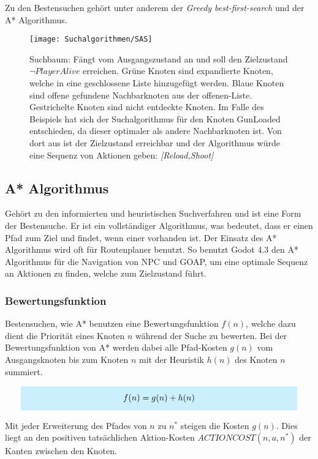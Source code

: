 Zu den Bestensuchen gehört unter anderem der \textit{Greedy best-first-search} und der A* Algorithmus.


\begin{figure}[h]
  \centering
  \texttt{[image: Suchalgorithmen/SAS]}
	\captionsetup{justification=justified, format=plain}
  \caption{Suchbaum: Fängt vom Ausgangszustand an und soll den Zielzustand $\lnot \textit{PlayerAlive}$ erreichen. Grüne Knoten sind expandierte Knoten, welche in eine geschlossene Liste hinzugefügt werden. Blaue Knoten sind offene gefundene Nachbarknoten aus der offenen-Liste. Gestrichelte Knoten sind nicht entdeckte Knoten. Im Falle des Beispiels hat sich der Suchalgorithmus für den Knoten GunLoaded entschieden, da dieser optimaler als andere Nachbarknoten ist. Von dort aus ist der Zielzustand erreichbar und der Algorithmus würde eine Sequenz von Aktionen geben: \textit{[Reload,Shoot]}}
  \label{Suchalgorithmen}
\end{figure}
\clearpage

\subsection{A* Algorithmus}

Gehört zu den informierten und heuristischen Suchverfahren und ist eine Form der Bestensuche. Er ist ein vollständiger Algorithmus, was bedeutet, dass er einen Pfad zum Ziel und findet, wenn einer vorhanden ist. Der Einsatz des A* Algorithmus wird oft für Routenplaner benutzt. So benutzt Godot 4.3 den A* Algorithmus für die Navigation von NPC und GOAP, um eine optimale Sequenz an Aktionen zu finden, welche zum Zielzustand führt.

\subsubsection{Bewertungsfunktion}

Bestensuchen, wie A* benutzen eine Bewertungsfunktion $f(n)$, welche dazu dient die Priorität eines Knoten $n$ während der Suche zu bewerten. Bei der Bewertungsfunktion von A* werden dabei alle Pfad-Kosten $g(n)$ vom Ausgangsknoten bis zum Knoten $n$ mit der Heuristik $h(n)$ des Knoten $n$ summiert.

\[
\highlightbox{0.9\textwidth}{$
    \begin{aligned}
			f(n) = g(n) + h(n)
    \end{aligned}
$}
\]

Mit jeder Erweiterung des Pfades von $n$ zu $n^{\ast}$ steigen die Kosten $g(n)$. Dies liegt an den positiven tatsächlichen Aktion-Kosten $ACTIONCOST(n,a,n^*)$ der Kanten zwischen den Knoten.

